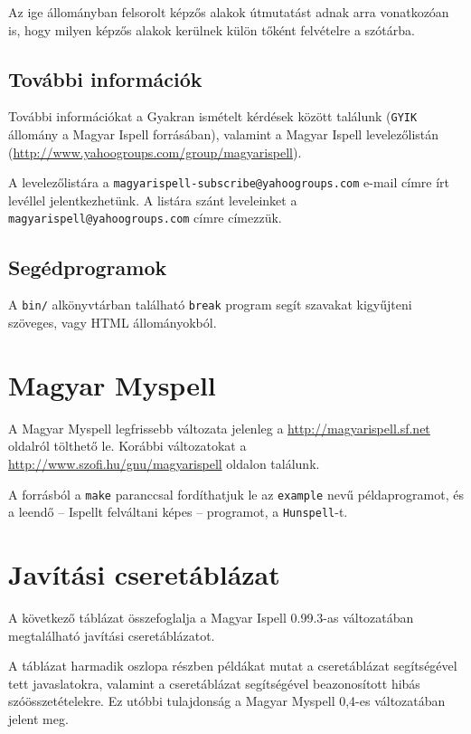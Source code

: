 Az ige állományban felsorolt képzős alakok útmutatást adnak
arra vonatkozóan is, hogy milyen képzős alakok kerülnek külön
tőként felvételre a szótárba.

\subsection{További információk}

További információkat a Gyakran ismételt kérdések között
találunk (\texttt{GYIK} állomány a Magyar Ispell forrásában),
valamint a Magyar Ispell levelezőlistán (\url{http://www.yahoogroups.com/group/magyarispell}).

A levelezőlistára a \texttt{magyarispell-subscribe@yahoogroups.com}
e-mail címre írt levéllel jelentkezhetünk. A listára szánt leveleinket
a \texttt{magyarispell@yahoogroups.com} címre címezzük.

\subsection{Segédprogramok}

A \texttt{bin/} alkönyvtárban található \texttt{break} program
segít szavakat kigyűjteni szöveges, vagy HTML állományokból.

\section{Magyar Myspell}

A Magyar Myspell legfrissebb változata jelenleg a
\url{http://magyarispell.sf.net}
oldalról tölthető le. Korábbi változatokat a
\url{http://www.szofi.hu/gnu/magyarispell} oldalon
találunk.

A forrásból a \texttt{make} paranccsal fordíthatjuk le
az \texttt{example} nevű példaprogramot, és a leendő
-- Ispellt felváltani képes -- programot, a \texttt{Hunspell}-t.

\section{Javítási cseretáblázat}

A következő táblázat összefoglalja a
Magyar Ispell 0.99.3-as változatában megtalálható
javítási cseretáblázatot.

A táblázat harmadik oszlopa részben példákat mutat
a cseretáblázat segítségével tett javaslatokra, valamint
a cseretáblázat segítségével beazonosított hibás
szóösszetételekre. Ez utóbbi tulajdonság a Magyar Myspell
0,4-es változatában jelent meg.

